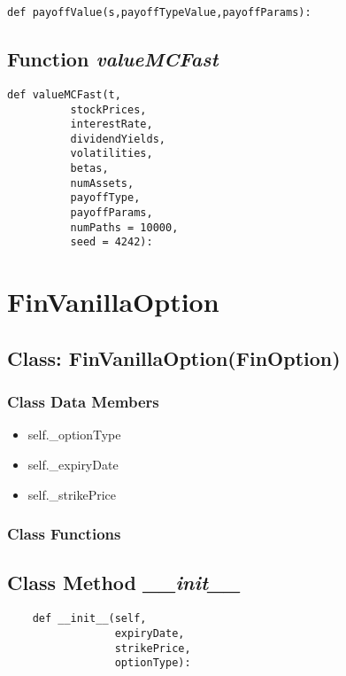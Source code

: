 \documentclass[twoside,11pt]{book}
\begin{document}
\begin{lstlisting}
def payoffValue(s,payoffTypeValue,payoffParams):
\end{lstlisting}

\subsection{Function {\it valueMCFast}}


\begin{lstlisting}
def valueMCFast(t,
          stockPrices,
          interestRate,
          dividendYields,
          volatilities,
          betas,
          numAssets,
          payoffType,
          payoffParams,
          numPaths = 10000,
          seed = 4242):
\end{lstlisting}

\newpage
\section{FinVanillaOption}

\subsection{Class: FinVanillaOption(FinOption)}


\subsubsection{Class Data Members}
\begin{itemize}
\item{self.\_optionType}
\item{self.\_expiryDate}
\item{self.\_strikePrice}
\end{itemize}

\subsubsection{Class Functions}

\subsection{Class Method {\it \_\_init\_\_}}


\begin{lstlisting}
    def __init__(self,
                 expiryDate,
                 strikePrice,
                 optionType):
\end{lstlisting}
\end{document}
